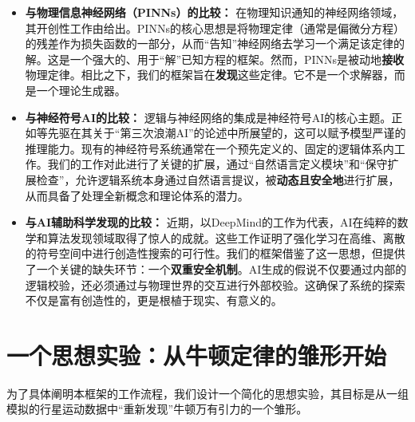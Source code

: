 \documentclass[11pt, a4paper]{article}
\begin{document}
\begin{itemize}
	\item \textbf{与物理信息神经网络（PINNs）的比较：}
	在物理知识通知的神经网络领域，其开创性工作由\cite{raissi2019pinns}给出。PINNs的核心思想是将物理定律（通常是偏微分方程）的残差作为损失函数的一部分，从而“告知”神经网络去学习一个满足该定律的解。这是一个强大的、用于“解”已知方程的框架。然而，PINNs是被动地\textbf{接收}物理定律。相比之下，我们的框架旨在\textbf{发现}这些定律。它不是一个求解器，而是一个理论生成器。
	
	\item \textbf{与神经符号AI的比较：}
	逻辑与神经网络的集成是神经符号AI的核心主题。正如\cite{garcez2019neural}等先驱在其关于“第三次浪潮AI”的论述中所展望的，这可以赋予模型严谨的推理能力。现有的神经符号系统通常在一个预先定义的、固定的逻辑体系内工作。我们的工作对此进行了关键的扩展，通过“自然语言定义模块”和“保守扩展检查”，允许逻辑系统本身通过自然语言提议，被\textbf{动态且安全地}进行扩展，从而具备了处理全新概念和理论体系的潜力。
	
	\item \textbf{与AI辅助科学发现的比较：}
	近期，以DeepMind的工作为代表，AI在纯粹的数学和算法发现领域取得了惊人的成就\cite{fawzi2022discovering}。这些工作证明了强化学习在高维、离散的符号空间中进行创造性搜索的可行性。我们的框架借鉴了这一思想，但提供了一个关键的缺失环节：一个\textbf{双重安全机制}。AI生成的假说不仅要通过内部的逻辑校验，还必须通过与物理世界的交互进行外部校验。这确保了系统的探索不仅是富有创造性的，更是根植于现实、有意义的。
\end{itemize}


\section{一个思想实验：从牛顿定律的雏形开始}

为了具体阐明本框架的工作流程，我们设计一个简化的思想实验，其目标是从一组模拟的行星运动数据中“重新发现”牛顿万有引力的一个雏形。
\end{document}
